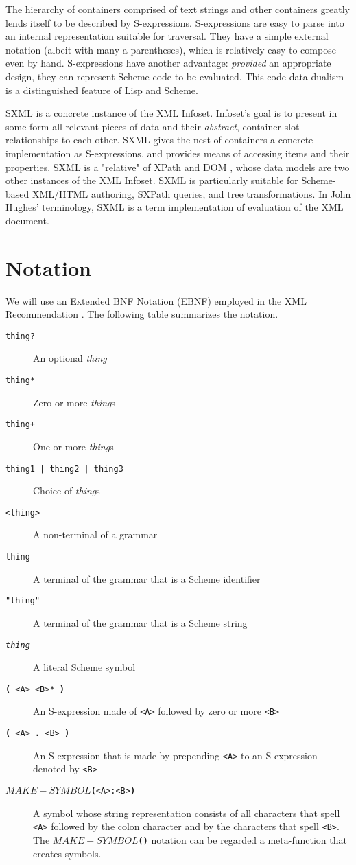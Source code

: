 \documentclass[10pt]{article}
\begin{document}
The hierarchy of containers comprised of text strings and other
containers greatly lends itself to be described by
S-expressions. S-expressions \cite{McCarthy} are easy to parse into an internal
representation suitable for traversal.  They have a simple external
notation (albeit with many a parentheses), which is relatively easy to
compose even by hand.  S-expressions have another advantage: \emph{provided} an appropriate design, they can represent Scheme code to be evaluated.
 This code-data dualism is a distinguished feature of Lisp and Scheme. 

SXML is a concrete instance of the XML Infoset. Infoset's goal is
to present in some form all relevant pieces of data and their \emph{abstract}, container-slot relationships to each other.  SXML gives
the nest of containers a concrete implementation as S-expressions, and
provides means of accessing items and their properties. SXML is a
"relative" of XPath \cite{XPath} and DOM \cite{DOM}, whose data models are two other
instances of the XML Infoset. SXML is particularly suitable for
Scheme-based XML/HTML authoring, SXPath queries, and tree
transformations. In John Hughes' terminology, SXML is a term
implementation of evaluation of the XML document.

\section{Notation}
We will use an Extended BNF Notation (EBNF) employed in the XML
Recommendation \cite{XML}. The following table summarizes the notation.

\begin{description}
\item [\texttt{thing?}] An optional \emph{thing}
\item [\texttt{thing*}] Zero or more \emph{thing}s
\item [\texttt{thing+}] One or more \emph{thing}s
\item [\texttt{thing1 | thing2 | thing3}] Choice of \emph{thing}s
\item [\texttt{<thing>}] A non-terminal of a grammar
\item [\texttt{thing}] A terminal of the grammar that is a Scheme identifier
\item [\texttt{"thing"}] A terminal of the grammar that is a Scheme string
\item [\texttt{{\itshape thing}}] A literal Scheme symbol
\item [\texttt{\textbf{(} <A> <B>* \textbf{)}}] An S-expression made of \texttt{<A>} followed by zero or more \texttt{<B>}
\item [\texttt{\textbf{(} <A>\textbf{ . }<B> \textbf{)}}] An S-expression that is made by prepending \texttt{<A>} to an S-expression denoted by \texttt{<B>}
\item [\texttt{\textbf{$MAKE-SYMBOL$(}<A>:<B>\textbf{)}}] A symbol whose string representation consists of all
characters that spell \texttt{<A>} followed by the colon character and by the characters that spell \texttt{<B>}. The \texttt{\textbf{$MAKE-SYMBOL$(}\textbf{)}} notation can be regarded a meta-function that creates symbols.
\end{description}
\end{document}
